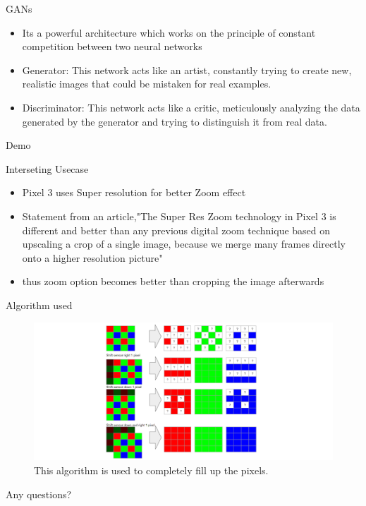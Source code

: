 \documentclass{beamer}
\begin{document}
\begin{frame}{GANs}
  \begin{itemize}
    \item Its a powerful architecture which works on the principle of  constant competition between two neural networks 
    \item Generator: This network acts like an artist, constantly trying to create new, realistic images that could be mistaken for real examples.
    \item Discriminator: This network acts like a critic, meticulously analyzing the data generated by the generator and trying to distinguish it from real data.
    
  \end{itemize}
\end{frame}

\begin{frame}
  \LARGE{Demo}
\end{frame}

\begin{frame}{Interseting Usecase}
  \begin{itemize}
    \item Pixel 3 uses Super resolution for better Zoom effect 
    \item Statement from an article,"The Super Res Zoom technology in Pixel 3 is different and better than any previous digital zoom technique based on upscaling a crop of a single image, because we merge many frames directly onto a higher resolution picture"
    \item thus zoom option becomes better than cropping the image afterwards
  \end{itemize}
\end{frame}

\begin{frame}{Algorithm used}
  \begin{figure}
      \centering
      \includegraphics[width=\linewidth]{usecase.png}
      \caption{This algorithm is used to completely fill up the pixels.}
      \label{fig:Algo}
  \end{figure}
\end{frame}

\begin{frame}
  \LARGE{Any questions?}
\end{frame}
\end{document}
